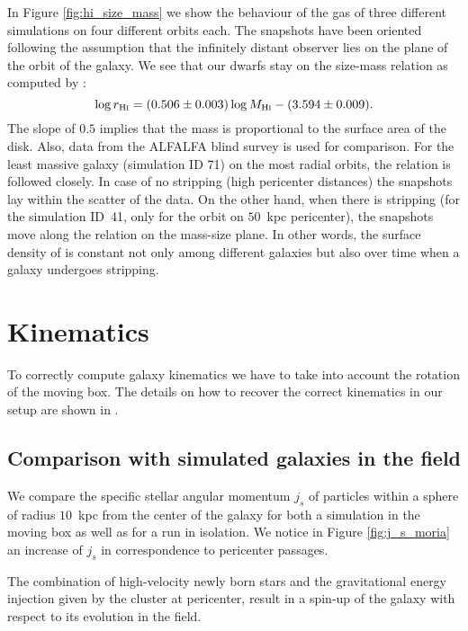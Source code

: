 In Figure \ref{fig:hi_size_mass} we show the behaviour of the gas of three different simulations on four different orbits each.
The snapshots have been oriented following the assumption that the infinitely distant observer lies on the plane of the orbit of the galaxy.
We see that our dwarfs stay on the \Hi{} size-mass relation as computed by \citet{Wang2016}:
\begin{equation*}
  \log r_{\text{H\textsc{i}}} = (0.506 \pm 0.003) \log M_{\text{H\textsc{i}}} -(3.594 \pm 0.009).
\end{equation*}
The slope of $0.5$ implies that the \Hi{} mass is proportional to the surface area of the \Hi{} disk.
Also, data from the ALFALFA blind survey \citep{Papastergis2016} is used for comparison.
For the least massive galaxy (simulation ID 71) on the most radial orbits, the relation is followed closely.
In case of no stripping (high pericenter distances) the snapshots lay within the scatter of the data. On the other hand, when there is stripping (for the simulation ID~41, only for the orbit on $50$~kpc pericenter), the snapshots move along the relation on the mass-size plane.
In other words, the surface density of \Hi{} is constant not only among different galaxies but also over time when a galaxy undergoes stripping.

\section{Kinematics}
To correctly compute galaxy kinematics we have to take into account the rotation of the moving box.
The details on how to recover the correct kinematics in our setup are shown in .

\subsection{Comparison with simulated galaxies in the field}
We compare the specific stellar angular momentum $j_s$ of particles within a sphere of radius $10$~kpc from the center of the galaxy for both a simulation in the moving box as well as for a run in isolation.
We notice in Figure \ref{fig:j_s_moria} an increase of $j_s$ in correspondence to pericenter passages.

The combination of high-velocity newly born stars and the gravitational energy injection given by the cluster at pericenter, result in a spin-up of the galaxy with respect to its evolution in the field.


